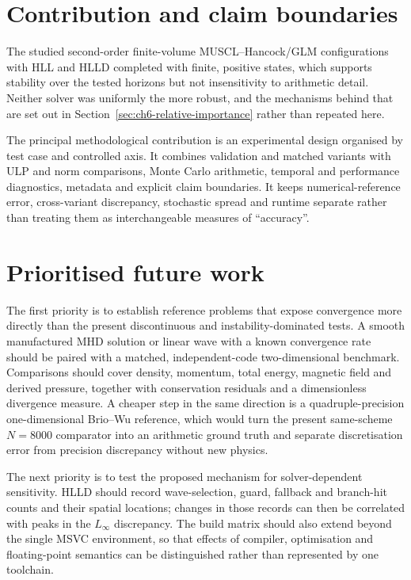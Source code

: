 \section{Contribution and claim boundaries}

The studied second-order finite-volume MUSCL--Hancock/GLM configurations with
HLL and HLLD completed with finite, positive states, which supports stability
over the tested horizons but not insensitivity to arithmetic detail. Neither
solver was uniformly the more robust, and the mechanisms behind that are set
out in Section~\ref{sec:ch6-relative-importance} rather than repeated here.

The principal methodological contribution is an experimental design organised
by test case and controlled axis.
It combines validation and matched variants with ULP and norm comparisons,
Monte Carlo arithmetic, temporal and performance diagnostics, metadata and
explicit claim boundaries. It keeps numerical-reference error, cross-variant
discrepancy, stochastic spread and runtime separate rather than treating them
as interchangeable measures of ``accuracy''.

\section{Prioritised future work}

The first priority is to establish reference problems that expose convergence
more directly than the present discontinuous and instability-dominated tests.
A smooth manufactured MHD solution or linear wave with a known convergence
rate should be paired with a matched, independent-code two-dimensional
benchmark. Comparisons should cover density, momentum, total energy, magnetic
field and derived pressure, together with conservation residuals and a
dimensionless divergence measure. A cheaper step in the same direction is a
quadruple-precision one-dimensional Brio--Wu reference, which would turn the
present same-scheme $N=8000$ comparator into an arithmetic ground truth and
separate discretisation error from precision discrepancy without new physics.

The next priority is to test the proposed mechanism for solver-dependent
sensitivity. HLLD should record wave-selection, guard, fallback and branch-hit
counts and their spatial locations; changes in those records can then be
correlated with peaks in the $L_\infty$ discrepancy. The build matrix should
also extend beyond the single MSVC environment, so that effects of compiler,
optimisation and floating-point semantics can be distinguished rather than
represented by one toolchain.

